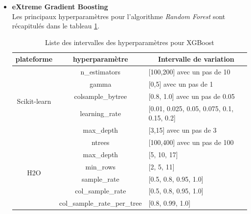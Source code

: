 \begin{itemize}
        \item[\ding{233}]\textbf{eXtreme Gradient Boosting}\\%
Les principaux hyperparamètres pour l'algorithme \textit{Random Forest} sont récapitulés dans le tableau \ref{tab:HP-XGB-OP}.
        \begin{table}[h!]
        \centering
        \begin{tabular}{|c|c|p{5.8cm}p{0cm}|}
        \hline
       plateforme & hyperparamètre &\multicolumn{2}{|c|}{Intervalle de variation} \\ \hline
       \multirow{5}{*}{Scikit-learn} 
        & n\_estimators & [100,200] avec un pas de 10  &\\
        & gamma & [0,5] avec un pas de 1 &\\ 
        & colsample\_bytree & [0.8, 1.0] avec un pas de 0.05 &\\
        & learning\_rate & [0.01, 0.025, 0.05, 0.075, 0.1, 0.15, 0.2] &\\
        & max\_depth & [3,15] avec un pas de 3 &\\
         \hline
        \multirow{6}{*}{H2O} 
        & ntrees &   [100,400] avec un pas de 100 &\\
        & max\_depth & [5, 10, 17] &\\
        & min\_rows &  [2, 5, 11] &\\ 
        & sample\_rate & [0.5, 0.8, 0.95, 1.0] &\\
        & col\_sample\_rate & [0.5, 0.8, 0.95, 1.0] &\\
        & col\_sample\_rate\_per\_tree & [0.8, 0.99, 1.0] &\\
         \hline
       \end{tabular}
               \caption{Liste des intervalles des hyperparamètres pour XGBoost}
               \label{tab:HP-XGB-OP}
        \end{table}
\end{itemize}
